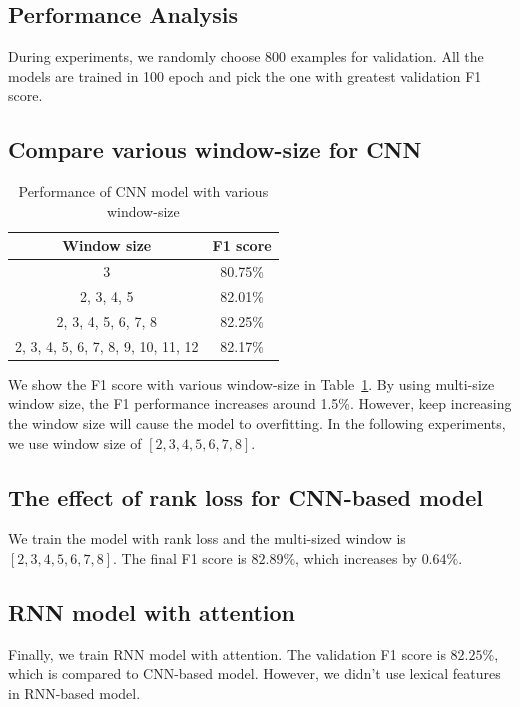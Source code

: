 \documentclass[a4paper]{article}
\begin{document}
\begin{spacing}{1.0}
  \section{Performance Analysis}
  During experiments, we randomly choose 800 examples for validation. All the models are trained in 100 epoch and pick the one with greatest validation F1 score. 
  
  \subsection{Compare various window-size for CNN}
  \begin{table}
    \centering
    \caption{Performance of CNN model with various window-size}
    \begin{tabular}{|c|c|}
      \hline
      Window size & F1 score \\\hline
      3        &  80.75\% \\\hline
      2, 3, 4, 5 & 82.01\% \\\hline
      2, 3, 4, 5, 6, 7, 8 & 82.25\% \\\hline
      2, 3, 4, 5, 6, 7, 8, 9, 10, 11, 12 & 82.17\% \\\hline
    \end{tabular}
    \label{tab:cnn_window_size}
  \end{table}
  We show the F1 score with various window-size in Table~\ref{tab:cnn_window_size}. By using multi-size window size, the F1 performance increases around 1.5\%. However, keep increasing the window size will cause the model to overfitting. In the following experiments, we use window size of $[2, 3, 4, 5, 6, 7, 8]$.
  
  \subsection{The effect of rank loss for CNN-based model}
  We train the model with rank loss \cite{cnn_rank_loss} and the multi-sized window is $[2, 3, 4, 5, 6, 7, 8]$. The final F1 score is $82.89\%$, which increases by $0.64\%$.
  
  \subsection{RNN model with attention}
  Finally, we train RNN model with attention. The validation F1 score is $82.25\%$, which is compared to CNN-based model. However, we didn't use lexical features in RNN-based model.  
  
  
  \end{spacing}  
  
  
\end{document}
